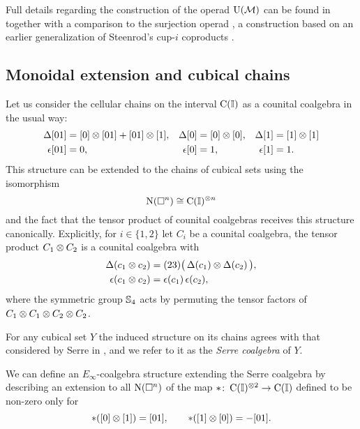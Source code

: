 Full details regarding the construction of the operad $\operatorname{\mathrm{U}(\mathcal{M})}$ can be found in \cite{medina2020prop1, medina2021prop2} together with a comparison to the surjection operad \cite{mcclure2003multivariable, berger2004combinatorial}, a construction based on an earlier generalization of Steenrod's cup-$i$ coproducts \cite[\S4.5]{benson1998representations}.

\subsection{Monoidal extension and cubical chains}

Let us consider the cellular chains on the interval $\operatorname{C}(\mathbb{I})$ as a counital coalgebra in the usual way:
\begin{align*}
	\operatorname{\Delta}[01] &= [0] \otimes [01] + [01] \otimes [1], &
	\operatorname{\Delta}[0]  &= [0] \otimes [0], &
	\operatorname{\Delta}[1]  &= [1] \otimes [1] \\
	\operatorname{\epsilon}[01] &= 0, &
	\operatorname{\epsilon}[0]  &= 1, &
	\operatorname{\epsilon} [1]  &= 1.
\end{align*}
This structure can be extended to the chains of cubical sets using the isomorphism
\[
\operatorname{N}(\square^n) \cong \operatorname{C}(\mathbb{I})^{\otimes n}
\]
and the fact that the tensor product of counital coalgebras receives this structure canonically.
Explicitly, for $i \in \{1,2\}$ let $C_i$ be a counital coalgebra, the tensor product $C_1 \otimes C_2$ is a counital coalgebra with
\begin{align} \label{e:extension of coproduct}
	\operatorname{\Delta}(c_1 \otimes c_2) &= (23) \big( \operatorname{\Delta}(c_1) \otimes \operatorname{\Delta}(c_2) \, \big), \\
	\label{e:extension of augmentation}
	\operatorname{\epsilon}(c_1 \otimes c_2) &= \operatorname{\epsilon}(c_1) \operatorname{\epsilon}(c_2),
\end{align}
where the symmetric group $\mathbb{S}_4$ acts by permuting the tensor factors of $C_1 \otimes C_1 \otimes C_2 \otimes C_2$.

For any cubical set $Y$ the induced structure on its chains agrees with that considered by Serre in \cite{serre1951homologie}, and we refer to it as the \textit{Serre coalgebra} of $Y$.

We can define an $E_\infty$-coalgebra structure extending the Serre coalgebra by describing an extension to all $\operatorname{N}(\square^n)$ of the map $\ast \colon \operatorname{C}(\mathbb{I})^{\otimes 2} \to \operatorname{C}(\mathbb{I})$ defined to be non-zero only for
\[
\ast([0] \otimes [1]) = [01], \qquad
\ast([1] \otimes [0]) = - [01].
\]

